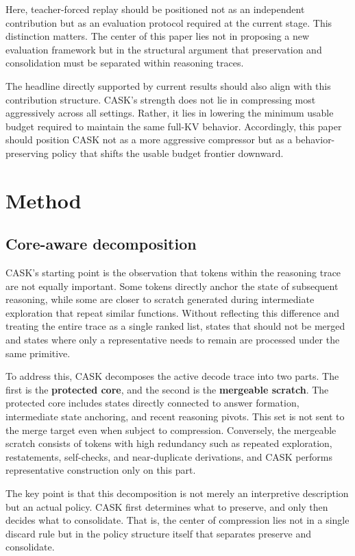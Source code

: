 Here, teacher-forced replay should be positioned not as an independent contribution but as an evaluation protocol required at the current stage. This distinction matters. The center of this paper lies not in proposing a new evaluation framework but in the structural argument that preservation and consolidation must be separated within reasoning traces.


The headline directly supported by current results should also align with this contribution structure. CASK's strength does not lie in compressing most aggressively across all settings. Rather, it lies in lowering the minimum usable budget required to maintain the same full-KV behavior. Accordingly, this paper should position CASK not as a more aggressive compressor but as a behavior-preserving policy that shifts the usable budget frontier downward.


\section{Method}


\subsection{Core-aware decomposition}


CASK's starting point is the observation that tokens within the reasoning trace are not equally important. Some tokens directly anchor the state of subsequent reasoning, while some are closer to scratch generated during intermediate exploration that repeat similar functions. Without reflecting this difference and treating the entire trace as a single ranked list, states that should not be merged and states where only a representative needs to remain are processed under the same primitive.


To address this, CASK decomposes the active decode trace into two parts. The first is the \textbf{protected core}, and the second is the \textbf{mergeable scratch}. The protected core includes states directly connected to answer formation, intermediate state anchoring, and recent reasoning pivots. This set is not sent to the merge target even when subject to compression. Conversely, the mergeable scratch consists of tokens with high redundancy such as repeated exploration, restatements, self-checks, and near-duplicate derivations, and CASK performs representative construction only on this part.


The key point is that this decomposition is not merely an interpretive description but an actual policy. CASK first determines what to preserve, and only then decides what to consolidate. That is, the center of compression lies not in a single discard rule but in the policy structure itself that separates preserve and consolidate.


